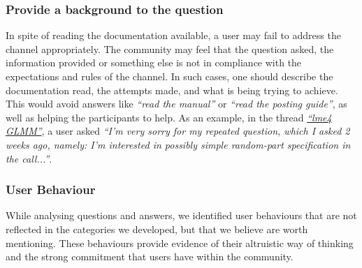 \subsubsection{Provide a background to the question}

    In spite of reading the documentation available, a user may fail to address the channel appropriately.
    The community may feel that the question asked, the information provided or something else is not in compliance with the expectations and rules of the channel.
    In such cases, one should describe the documentation read, the attempts made, and what is being trying to achieve.
    This would avoid answers like \textit{``read the manual''} or \textit{``read the posting guide''}, as well as helping the participants to help.
    As an example, in the thread \textit{\href{https://goo.gl/Gbek3R}{``lme4 GLMM''}}, a user asked \textit{``I'm very sorry for my repeated question, which I asked 2 weeks ago, namely: I'm interested in possibly simple random-part specification in the call...''}.

\subsubsection{User Behaviour}
\label{sec:userbeh}

While analysing questions and answers, we identified user behaviours that are not reflected in the categories we developed, but that we believe are worth
mentioning.  These behaviours provide evidence of their altruistic way of thinking and the strong commitment that users have within the community.

